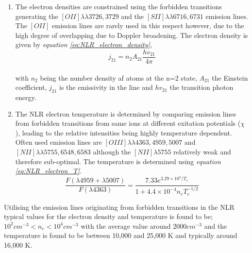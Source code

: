 \documentclass[a4paper, 12pt, twoside]{article}
\begin{document}
\begin{enumerate}
\item The electron densities are constrained using the forbidden transitions generating the $[OII] \lambda\lambda 3726,3729$ and the $[SII] \lambda\lambda 6716,6731$ emission lines. The $[OII]$ emission lines are rarely used in this respect however, due to the high degree of overlapping due to Doppler broadening. The electron density is given by \emph{equation \ref{eq:NLR_electron_density}},
\begin{equation}
j_{21} = n_{2}A_{21}\frac{hv_{21}} {4\pi}
\label{eq:NLR_electron_density}
\end{equation}\\
with $n_{2}$ being the number density af atoms at the n=2 state, $A_{21}$ the Einstein coefficient, $j_{21}$ is the emissivity in the line and $hv_{21}$ the transition photon energy.
\item The NLR electron temperature is determined by comparing emission lines from forbidden transitions from same ions at different exitation potentials ($\chi$), leading to the relative intensities being highly temperature dependent. Often used emission lines are $[OIII]\lambda\lambda 4363,4959,5007$ and $[NII] \lambda\lambda 5755,6548,6583$ although the $[NII] \lambda 5755$ relatively weak and therefore sub-optimal. The temperature is determined using \emph{equation \ref{eq:NLR_electron_T}}.
\begin{equation}
\frac{F(\lambda4959 + \lambda5007)} {F(\lambda4363)} = \frac{7.33e^{3.29\times10^{4}/T_{e}}} {1 + 4.4\times10^{-4}n_{e}T_{e}^{-1/2}}
\label{eq:NLR_electron_T}
\end{equation}
\end{enumerate}
Utilising the emission lines originating from forbidden transitions in the NLR typical values for the electron density and temperature is found to be; $10^{2} cm^{-3} < n_{e} < 10^{4} cm^{-3}$ with the average value around 2000$cm^{-3}$ and the temperature is found to be between 10,000 and 25,000 K and typically around 16,000 K. 
\end{document}
